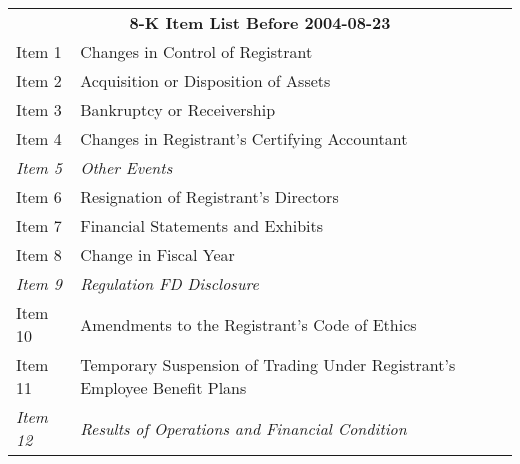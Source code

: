 
\begin{table}[H]
  \centering
    \begin{tabular}{ll}
    \multicolumn{2}{c}{\textbf{8-K Item List Before 2004-08-23}} \\
    Item 1 & Changes in Control of Registrant \\
    Item 2 & Acquisition or Disposition of Assets \\
    Item 3 & Bankruptcy or Receivership \\
    Item 4 & Changes in Registrant's Certifying Accountant \\
    \textit{Item 5} & \textit{Other Events} \\
    Item 6 & Resignation of Registrant's Directors \\
    Item 7 & Financial Statements and Exhibits \\
    Item 8 & Change in Fiscal Year \\
    \textit{Item 9} & \textit{Regulation FD Disclosure} \\
    Item 10 & Amendments to the Registrant's Code of Ethics \\
    Item 11 & Temporary Suspension of Trading Under Registrant's Employee Benefit Plans \\
    \textit{Item 12} & \textit{Results of Operations and Financial Condition} \\
    \end{tabular}%
\end{table}%
\newpage
